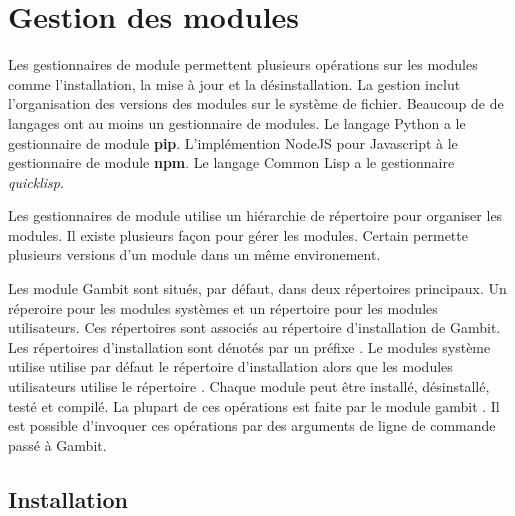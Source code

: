 
\chapter{Gestion des modules}
\label{ch:module_management}

Les gestionnaires de module permettent plusieurs opérations sur les modules
comme l'installation, la mise à jour et la désinstallation. La gestion inclut
l'organisation des versions des modules sur le système de fichier. Beaucoup de
de langages ont au moins un gestionnaire de modules. Le langage Python a le
gestionnaire de module \textbf{pip}. L'implémention NodeJS pour Javascript à
le gestionnaire de module \textbf{npm}. Le langage Common Lisp a le gestionnaire
\textit{quicklisp}.

Les gestionnaires de module utilise un hiérarchie de répertoire pour
organiser les modules. Il existe plusieurs façon pour gérer les modules.
Certain permette plusieurs versions d'un module dans un même environement.

Les module Gambit sont situés, par défaut, dans deux répertoires principaux.
Un réperoire pour les modules systèmes et un répertoire pour les modules
utilisateurs. Ces répertoires sont associés au répertoire d'installation de
Gambit. Les répertoires d'installation sont dénotés par un préfixe
\lstcode{\~\~}.  Le modules système utilise utilise par défaut le répertoire
d'installation  alors que les modules utilisateurs utilise le
répertoire . Chaque module peut être installé, désinstallé, testé
et compilé. La plupart de ces opérations est faite par le module gambit .
Il est possible d'invoquer ces opérations par des arguments de ligne de
commande passé à Gambit.


\section{Installation}

